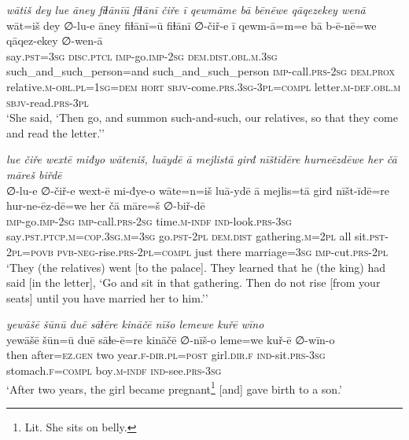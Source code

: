 \ea \label{KŠ.86}
\textit{wātiš dey lue āney fiɫānīū fiɫānī čiře ī qewmāme bā bēnēwe qāqezekey wenā} \\ 
\gll wāt=iš dey ∅-lu-e āney fiɫānī=ū fiɫānī ∅-čiř-e ī qewm-ā=m=e bā b-ē-nē=we qāqez-ekey ∅-wen-ā \\ 
 say\textsc{.pst}\textsc{=3sg} \textsc{disc.ptcl} \textsc{imp-}go.\textsc{imp-}\textsc{2sg} \textsc{dem.dist}\textsc{.obl}\textsc{.m}\textsc{.3sg} such\_and\_such\_person=and such\_and\_such\_person \textsc{imp-}call\textsc{.prs}-\textsc{2sg} \textsc{dem.prox} relative\textsc{.m}\textsc{-obl}\textsc{.pl}\textsc{=\textsc{1sg}}\textsc{=dem} \textsc{hort} \textsc{sbjv-}come\textsc{.prs}\textsc{.3sg}\textsc{-3pl}\textsc{=compl} letter\textsc{.m}\textsc{-def}\textsc{.obl}\textsc{.m} \textsc{sbjv-}read\textsc{.prs}\textsc{-3pl} \\ 
\glt `She said, ‘Then go, and summon such-and-such, our relatives, so that they come and read the letter.’'
\z 
 
\ea \label{KŠ.87}
\textit{lue čiře wextē miđyo wāteniš, luāydē ā mejlistā girđ nīštīdēre hurneēzdēwe her čā māreš biřdē} \\ 
\gll ∅-lu-e ∅-čiř-e wext-ē mi-đye-o wāte=n=iš luā-ydē ā mejlis=tā girđ nīšt-īdē=re hur-ne-ēz-dē=we her čā māre=š ∅-biř-dē \\ 
 \textsc{imp-}go.\textsc{imp-}\textsc{2sg} \textsc{imp-}call\textsc{.prs}-\textsc{2sg} time\textsc{.m}\textsc{-indf} \textsc{ind-}look\textsc{.prs}\textsc{-3sg} say\textsc{.pst}\textsc{.ptcp}\textsc{.m}\textsc{=cop}\textsc{.3sg}\textsc{.m}\textsc{=3sg} go\textsc{.pst}-\textsc{2pl} \textsc{dem.dist} gathering\textsc{.m}=\textsc{2pl} all sit\textsc{.pst}-\textsc{2pl}\textsc{=\textsc{povb}} \textsc{pvb-}\textsc{neg-}rise\textsc{.prs}-\textsc{2pl}\textsc{=compl} just there marriage\textsc{=3sg} \textsc{imp-}cut\textsc{.prs}-\textsc{2pl} \\ 
\glt `They (the relatives) went [to the palace]. They learned that he (the king) had said [in the letter], ‘Go and sit in that gathering. Then do not rise [from your seats] until you have married her to him.’'
\z 
 
\ea \label{KŠ.92}
\textit{yewāšē šūnū duē sāɫēre kināčē nīšo lemewe kuřē wīno} \\ 
\gll yewāšē šūn=ū duē sāɫe-ē=re kināčē ∅-nīš-o leme=we kuř-ē ∅-wīn-o \\ 
 then after\textsc{\textsc{=ez.gen}} two year\textsc{.f}\textsc{-dir}\textsc{.pl}\textsc{=\textsc{post}} girl\textsc{.dir}\textsc{.f} \textsc{ind-}sit\textsc{.prs}\textsc{-3sg} stomach\textsc{.f}\textsc{=compl} boy\textsc{.m}\textsc{-indf} \textsc{ind-}see\textsc{.prs}\textsc{-3sg} \\ 
\glt `After two years, the girl became pregnant\footnote{Lit. She sits on belly.} [and] gave birth to a son.'
\z 
 
